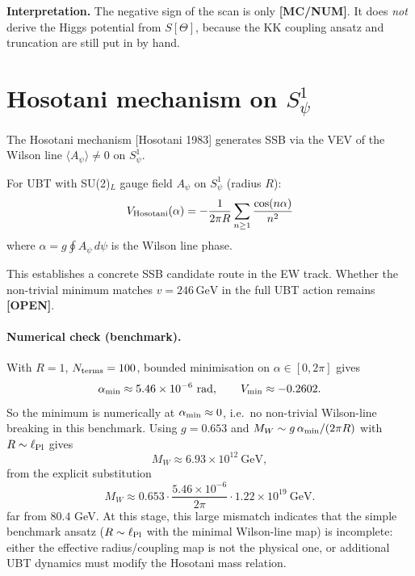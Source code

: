 \documentclass[12pt,a4paper]{article}
\begin{document}
\begin{openproblembox}
\textbf{Interpretation.}
The negative sign of the scan is only \textbf{[MC/NUM]}.
It does \emph{not} derive the Higgs potential from \(S[\Theta]\), because
the KK coupling ansatz and truncation are still put in by hand.
\end{openproblembox}

\section{Hosotani mechanism on $S^1_\psi$}
\label{sec:hosotani}

The Hosotani mechanism [Hosotani 1983] generates SSB via the
VEV of the Wilson line $\langle A_\psi\rangle\neq 0$ on $S^1_\psi$.

For UBT with SU(2)$_L$ gauge field $A_\psi$ on $S^1_\psi$ (radius $R$):
\begin{equation}
V_{\rm Hosotani}(\alpha) = -\frac{1}{2\pi R}\sum_{n\geq 1}
\frac{\cos(n\alpha)}{n^2}
\end{equation}
where $\alpha = g\oint A_\psi\,d\psi$ is the Wilson line phase.

This establishes a concrete SSB candidate route in the EW track.
Whether the non-trivial minimum matches $v=246\,\mathrm{GeV}$ in
the full UBT action remains \textbf{[OPEN]}.

\paragraph{Numerical check (benchmark).}
With $R=1$, $N_{\rm terms}=100$, bounded minimisation on
$\alpha\in[0,2\pi]$ gives
\[
\alpha_{\rm min}\approx 5.46\times 10^{-6}\ \mathrm{rad},
\qquad
V_{\rm min}\approx -0.2602.
\]
So the minimum is numerically at $\alpha_{\rm min}\approx 0$, i.e.\ no
non-trivial Wilson-line breaking in this benchmark.
Using $g=0.653$ and
$M_W\sim g\,\alpha_{\rm min}/(2\pi R)$ with $R\sim \ell_{\rm Pl}$
gives
\[
M_W \approx 6.93\times 10^{12}\ \mathrm{GeV},
\]
from the explicit substitution
\[
M_W \approx 0.653\cdot\frac{5.46\times10^{-6}}{2\pi}\cdot 1.22\times10^{19}\ \mathrm{GeV}.
\]
far from $80.4$ GeV.
At this stage, this large mismatch indicates that the simple benchmark
ansatz ($R\sim\ell_{\rm Pl}$ with the minimal Wilson-line map) is incomplete:
either the effective radius/coupling map is not the physical one, or
additional UBT dynamics must modify the Hosotani mass relation.
\end{document}
